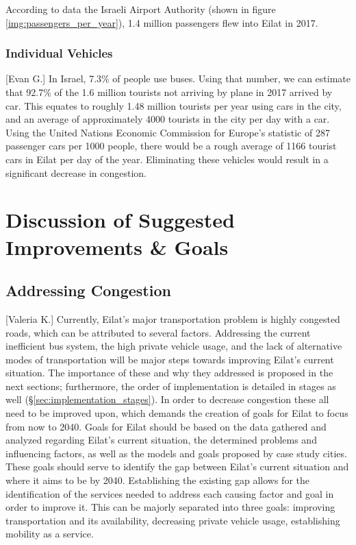 \documentclass[12pt]{article}                               %
\begin{document}
According to data the Israeli Airport Authority (shown in figure \ref{img:passengers_per_year}), 1.4 million passengers flew into Eilat in 2017.

\subsubsection{Individual Vehicles}[Evan G.]
In Israel, 7.3\% of people use buses. Using that number, we can estimate that 92.7\% of the 1.6 million tourists not arriving by plane in 2017 arrived by car. This equates to roughly 1.48 million tourists per year using cars in the city, and an average of approximately 4000 tourists in the city per day with a car. Using the United Nations Economic Commission for Europe's statistic of 287 passenger cars per 1000 people, there would be a rough average of 1166 tourist cars in Eilat per day of the year. Eliminating these vehicles would result in a significant decrease in congestion.




\newpage
\section{Discussion of Suggested Improvements \& Goals}\label{sec:discussion}
\subsection{Addressing Congestion}[Valeria K.]
Currently, Eilat's major transportation problem is highly congested roads, which can be attributed to several factors. Addressing the current inefficient bus system, the high private vehicle usage, and the lack of alternative modes of transportation will be major steps towards improving Eilat's current situation. The importance of these and why they addressed is proposed in the next sections; furthermore, the order of implementation is detailed in stages as well (\S\ref{sec:implementation_stages}). In order to decrease congestion these all need to be improved upon, which demands the creation of goals for Eilat to focus from now to 2040. Goals for Eilat should be based on the data gathered and analyzed regarding Eilat's current situation, the determined problems and influencing factors, as well as the models and goals proposed by case study cities. These goals should serve to identify the gap between Eilat's current situation and where it aims to be by 2040. Establishing the existing gap allows for the identification of the services needed to address each causing factor and goal in order to improve it. This can be majorly separated into three goals: improving transportation and its availability, decreasing private vehicle usage,  establishing mobility as a service. 
\end{document}
